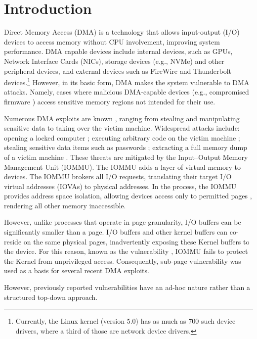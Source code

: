 \section{Introduction}

Direct Memory Access (DMA) is a technology that allows input-output (I/O) devices to access memory without CPU involvement, improving system performance.
DMA capable devices include internal devices, such as GPUs, Network Interface Cards (NICs), storage devices (e.g., NVMe) and other peripheral devices, and external devices such as FireWire and Thunderbolt devices.\footnote{Currently, the Linux kernel (version 5.0) has as much as 700 such device drivers, where a third of those are network device drivers.} However, in its basic form, DMA makes the system vulnerable to DMA attacks. Namely, cases where malicious DMA-capable devices (e.g., compromised firmware \cite{Gal14,Ben17a}) access sensitive memory regions not intended for their use. 


Numerous DMA exploits are known \cite{Dor04,BDK10,thunder}, ranging from stealing and manipulating sensitive data to taking over the victim machine. Widespread attacks include: opening a locked computer \cite{MM, Fin14}; executing arbitrary code on the victim machine \cite{Fri16, Woj08, AD10,thunder}; stealing sensitive data items such as passwords \cite{SB12, LKV13, Cim16, BR12}; extracting a full memory dump of a victim machine \cite{MM, Vol, Fin14, GA10}. These threats are mitigated by the Input–Output Memory Management Unit (IOMMU). The IOMMU adds a layer of virtual memory to devices. The IOMMU brokers all I/O requests, translating their target I/O virtual addresses (IOVAs) to physical addresses. In the process, the IOMMU provides address space isolation, allowing devices access only to permitted pages
, rendering all other memory inaccessible.

However, unlike processes that operate in page granularity, I/O buffers can be significantly smaller than a page. I/O buffers and other kernel buffers can co-reside on the same physical pages, inadvertently exposing these Kernel buffers to the device. For this reason, known as the \subpage{} vulnerability \cite{MMT16,thunder}, IOMMU fails to protect the Kernel from unprivileged access. Consequently, sub-page vulnerability was used as a basis for several recent DMA exploits.


However, previously reported vulnerabilities have an ad-hoc nature \cite{thunder,MMT16,Ben17b} rather than a structured top-down approach. 

